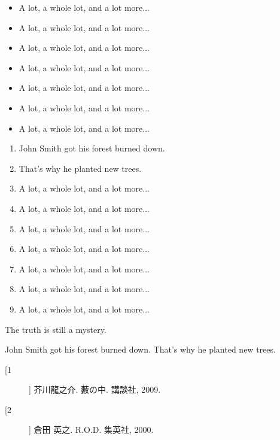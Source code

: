 \documentclass[landscape,a0b,final,a4resizeable]{include/a0poster}
\begin{document}
\begin{poster}
\begin{multicols}{3}
\begin{itemize}
  \item A lot, a whole lot, and a lot more...
  \item A lot, a whole lot, and a lot more...
  \item A lot, a whole lot, and a lot more...
  \item A lot, a whole lot, and a lot more...
  \item A lot, a whole lot, and a lot more...
  \item A lot, a whole lot, and a lot more...
  \item A lot, a whole lot, and a lot more...
\end{itemize}


\begin{enumerate}
  \item John Smith got his forest burned down.
  \item That's why he planted new trees.
  \item A lot, a whole lot, and a lot more...
  \item A lot, a whole lot, and a lot more...
  \item A lot, a whole lot, and a lot more...
  \item A lot, a whole lot, and a lot more...
  \item A lot, a whole lot, and a lot more...
  \item A lot, a whole lot, and a lot more...
  \item A lot, a whole lot, and a lot more...
\end{enumerate}

 The truth is still a mystery.

\end{multicols}

\vspace*{1em}

\begin{multicols}{2}
John Smith got his forest burned down.
That's why he planted new trees.

\newpage

\begin{description}
  \item[[1]] 芥川龍之介. 藪の中. 講談社, 2009.
  \item[[2]] 倉田 英之. R.O.D. 集英社, 2000.
\end{description}


\end{multicols}



\end{poster}
\end{document}
